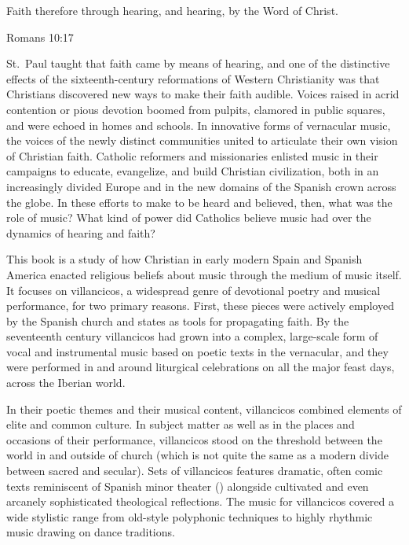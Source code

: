 %

\label{ch:musical-theology}

\epigraph
{Faith therefore  through hearing, and hearing, by the Word of Christ.}
{Romans 10:17}

St.~Paul taught that faith came by means of hearing, and one of the distinctive effects of the sixteenth-century reformations of Western Christianity was that Christians discovered new ways to make their faith audible.
Voices raised in acrid contention or pious devotion boomed from pulpits, clamored in public squares, and were echoed in homes and schools.
In innovative forms of vernacular music, the voices of the newly distinct communities united to articulate their own vision of Christian faith.
Catholic reformers and missionaries enlisted music in their campaigns to educate, evangelize, and build Christian civilization, both in an increasingly divided Europe and in the new domains of the Spanish crown across the globe.
In these efforts to make  to be heard and believed, then, what was the role of music?
What kind of power did Catholics believe music had over the dynamics of hearing and faith?

This book is a study of how Christian in early modern Spain and Spanish America enacted religious beliefs about music through the medium of music itself.
It focuses on villancicos, a widespread genre of devotional poetry and musical performance, for two primary reasons.
First, these pieces were actively employed by the Spanish church and states as tools for propagating faith.
By the seventeenth century villancicos had grown into a complex, large-scale form of vocal and instrumental music based on poetic texts in the vernacular, and they were performed in and around liturgical celebrations on all the major feast days, across the Iberian world.

In their poetic themes and their musical content, villancicos combined elements of elite and common culture.
In subject matter as well as in the places and occasions of their performance, villancicos stood on the threshold between the world in and outside of church (which is not quite the same as a modern divide between sacred and secular).
Sets of villancicos features dramatic, often comic texts reminiscent of Spanish minor theater () alongside cultivated and even arcanely sophisticated theological reflections.
The music for villancicos covered a wide stylistic range from old-style polyphonic techniques to highly rhythmic music drawing on dance traditions.

